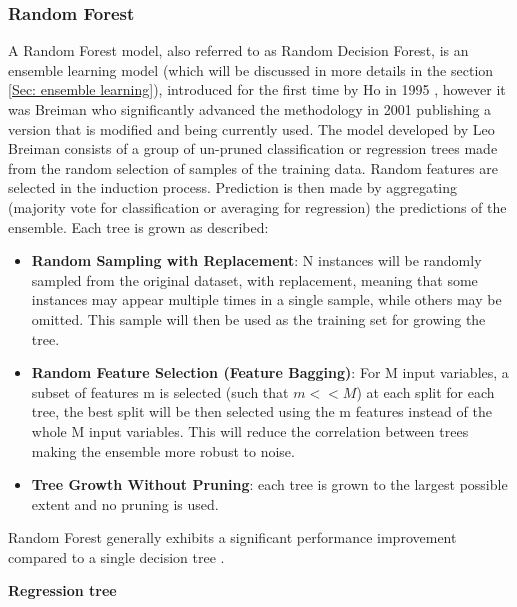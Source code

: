 \subsubsection{Random Forest}
\label{Sec: Random Forest}
A Random Forest model, also referred to as Random Decision Forest, is an ensemble learning model (which will be discussed in more details in the section \ref{Sec: ensemble learning}), introduced for the first time by Ho in 1995 \cite{Ho1995}, however it was Breiman who significantly advanced the methodology in 2001 \cite{Breiman2001} publishing a version that is modified and being currently used. The model developed by Leo Breiman consists of a group of un-pruned classification or regression trees made from the random selection of samples of the training data. Random features are selected in the induction process. Prediction is then made by aggregating (majority vote for classification or averaging for regression) the predictions of the ensemble. Each tree is grown as described:
\begin{itemize}
\item \textbf{Random Sampling with Replacement}: N instances will be randomly sampled from the original dataset, with replacement, meaning that some instances may appear multiple times in a single sample, while others may be omitted. This sample will then be used as the training set for growing the tree.
\item \textbf{Random Feature Selection (Feature Bagging)}: For M input variables, a subset of features m is selected (such that $m<<M$) at each split for each tree, the best split will be then selected using the m features instead of the whole M input variables. This will reduce the correlation between trees making the ensemble more robust to noise.
\item \textbf{Tree Growth Without Pruning}: each tree is grown to the largest possible extent and no pruning is used.
\end{itemize}

Random Forest generally exhibits a significant performance improvement compared to a single decision tree \cite{Sharma2015}. 

\textbf{Regression tree}

